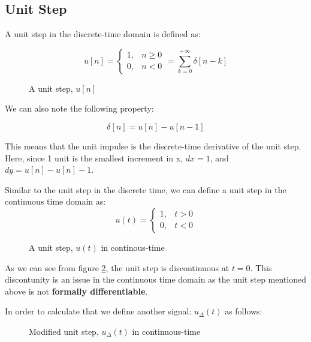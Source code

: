 \documentclass[letterpaper,12pt]{article}
\begin{document}
\newpage
\subsection{Unit Step}
A unit step in the discrete-time domain is defined as:

\[u[n] =
    \begin{cases}
        1, & n \geq 0 \\
        0, & n < 0
    \end{cases}
    = \sum_{k=0}^{+\infty} \delta[n-k]\]

\begin{figure}[!ht]
    \centering
    
    \caption{A unit step, $u[n]$}\label{fig:unit_step}
\end{figure}

We can also note the following property:

\[\delta [n] = u[n] - u[n-1]\]

This means that the unit impulse is the discrete-time derivative of the unit
step. Here, since 1 unit is the smallest increment in x, $dx = 1$, and $dy =
    u[n] - u[n] - 1$.

Similar to the unit step in the discrete time, we can define a unit step in the
continuous time domain as:
\[u(t) =
    \begin{cases}
        1, & t > 0 \\
        0, & t < 0
    \end{cases}\]

\begin{figure}[!ht]
    \centering
    
    \caption{A unit step, $u(t)$ in continous-time}\label{fig:unit_step_cont_dom}
\end{figure}

As we can see from figure \ref{fig:unit_step_cont_dom}, the unit step is
discontinuous at $t=0$. This discontunity is an issue in the continuous time
domain as the unit step mentioned above is not \textbf{formally
    differentiable}.

In order to calculate that we define another signal: $u_{\Delta}(t)$ as
follows:

\begin{figure}[!ht]
    \centering
    
    \caption{Modified unit step, $u_{\Delta}(t)$ in continuous-time}\label{fig:unit_step_cont_dom_delta}
\end{figure}
\end{document}
